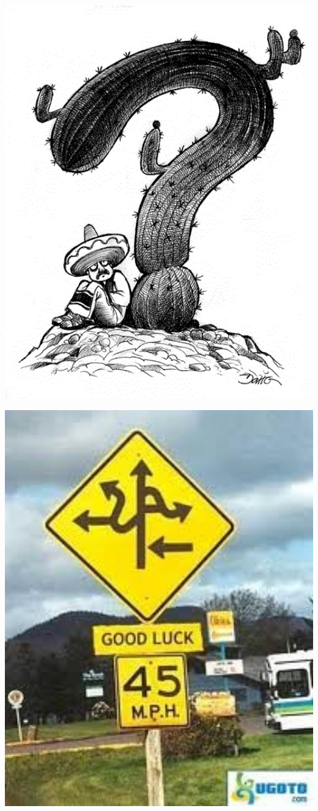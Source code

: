 \documentclass[
  letterpaper,
]{scrbook}
\begin{document}
\includegraphics[width=1\textwidth,height=\textheight]{./pictures/textkriterien_2.png}

\includegraphics[width=1\textwidth,height=\textheight]{./pictures/textkriterien_5.jpg}
\end{document}
